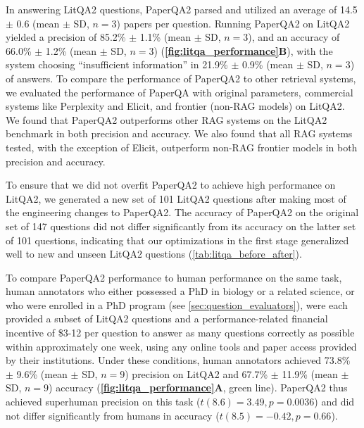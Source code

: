 \documentclass{article}
\begin{document}
\begin{bibunit}[unsrt]

In answering LitQA2 questions, PaperQA2 parsed and utilized an average of 14.5 $\pm$ 0.6 (mean $\pm$ SD, $n=3$) papers per question. Running PaperQA2 on LitQA2 yielded a precision of 85.2\% $\pm$ 1.1\% (mean $\pm$ SD, $n=3$), and an accuracy of 66.0\% $\pm$ 1.2\% (mean $\pm$ SD, $n=3$) (\textbf{\autoref{fig:litqa_performance}B}), with the system choosing ``insufficient information'' in 21.9\% $\pm$ 0.9\% (mean $\pm$ SD, $n=3$) of answers. To compare the performance of PaperQA2 to other retrieval systems, we evaluated the performance of PaperQA with original parameters, commercial systems like Perplexity\cite{perplexity} and Elicit\cite{elicit}, and frontier (non-RAG models) on LitQA2. We found that PaperQA2 outperforms other RAG systems on the LitQA2 benchmark in both precision and accuracy. We also found that all RAG systems tested, with the exception of Elicit, outperform non-RAG frontier models in both precision and accuracy. 

To ensure that we did not overfit PaperQA2 to achieve high performance on LitQA2, we generated a new set of 101 LitQA2 questions after making most of the engineering changes to PaperQA2. The accuracy of PaperQA2 on the original set of 147 questions did not differ significantly from its accuracy on the latter set of 101 questions, indicating that our optimizations in the first stage generalized well to new and unseen LitQA2 questions (\autoref{tab:litqa_before_after}).

To compare PaperQA2 performance to human performance on the same task, human annotators who either possessed a PhD in biology or a related science, or who were enrolled in a PhD program (see \autoref{sec:question_evaluators}), were each provided a subset of LitQA2 questions and a performance-related financial incentive of \$3-12 per question to answer as many questions correctly as possible within approximately one week, using any online tools and paper access provided by their institutions. Under these conditions, human annotators achieved 73.8\% $\pm$ 9.6\% (mean $\pm$ SD, $n=9$) precision on LitQA2 and 67.7\% $\pm$ 11.9\% (mean $\pm$ SD, $n=9$) accuracy (\textbf{\autoref{fig:litqa_performance}A}, green line). PaperQA2 thus achieved superhuman precision on this task ($t(8.6)=3.49, p=0.0036$) and did not differ significantly from humans in accuracy ($t(8.5)=-0.42, p=0.66$).


\end{bibunit}
\end{document}
